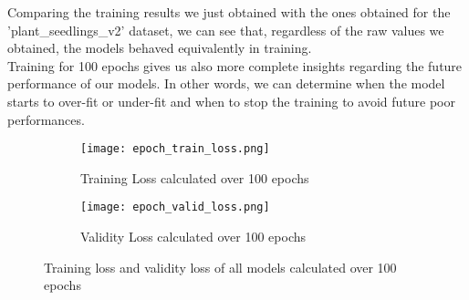 Comparing the training results we just obtained with the ones obtained for the 'plant\_seedlings\_v2' dataset, we can see that, regardless of the raw values we obtained, the models behaved equivalently in training. \\
Training for 100 epochs gives us also more complete insights regarding the future performance of our models. In other words, we can determine when the model starts to over-fit or under-fit and when to stop the training to avoid future poor performances. \\
\begin{figure}[h]
\begin{subfigure}{0.5\textwidth}
	    \texttt{[image: epoch\_train\_loss.png]}
	    \caption{Training Loss calculated over 100 epochs}
        \label{fig:train_loss}
        
     \end{subfigure} \hfill
     \begin{subfigure}{0.5\textwidth}
	    \texttt{[image: epoch\_valid\_loss.png]}
	    \caption{Validity Loss calculated over 100 epochs}
         \label{fig:valid_loss}
         
     \end{subfigure}
    
     
     \caption{ Training loss and validity loss of all models calculated over 100 epochs}
        \label{fig:tran_valid_loss}
\end{figure}


